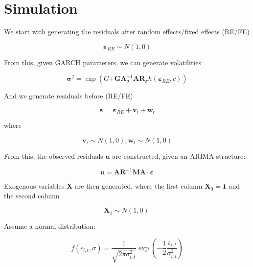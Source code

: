 \documentclass{article}
\author{}
\date{}
\begin{document}
\section{Simulation}\label{simulation}

We start with generating the residuals after random effects/fixed
effects (RE/FE)



  

\begin{equation}\mathbf{\varepsilon}_{RE}\sim N(1,0)
\label{eq:auto_1}
\end{equation}


From this, given GARCH parameters, we can generate volatilities

\[\mathbf{\sigma}^{2} = \exp\left( G\mathbf{+}\mathbf{GA}_{\sigma}^{- 1}\mathbf{AR}_{\sigma}h\left( \mathbf{\varepsilon}_{RE},c \right) \right)\]

And we generate residuals before (RE/FE)



  

\begin{equation}\mathbf{\varepsilon} = \mathbf{\varepsilon}_{RE} + \mathbf{v}_{i} + \mathbf{w}_{t}
\label{eq:auto_2}
\end{equation}


where



  

\begin{equation}\mathbf{v}_{i}\sim N(1,0), \mathbf{w}_{t}\sim N(1,0)
\label{eq:auto_3}
\end{equation}


From this, the observed residuals $\mathbf{u}$ are constructed, given
an ARIMA structure:



  

\begin{equation}
\mathbf{u = A}\mathbf{R}^{- 1}\mathbf{MA \cdot}\mathbf{\varepsilon}
\label{eq:68}
\end{equation}


Exogenous variables $\mathbf{X}$ are then generated, where the first
column $\mathbf{X}_{0}\mathbf{= 1}$ and the second column

\[\mathbf{X}_{1}\mathbf{\sim}N(1,0)\mathbf{\ }\]

Assume a normal distribution:



  

\begin{equation}
f\left( \epsilon_{i,t},\sigma \right) = \frac{1}{\sqrt{2\pi\sigma_{i,t}^{2}}}\exp\left( - \frac{1}{2}\frac{\varepsilon_{i,t}}{\sigma_{i,t}^{2}} \right)
\label{eq:69}
\end{equation}
\end{document}
